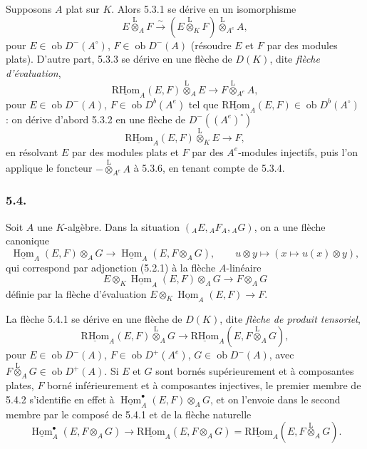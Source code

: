 \documentclass[11pt]{article}
\DeclareMathOperator{\Hom}{Hom}
\newcommand{\R}{\mathrm{R}}\newcommand{\RHomCore}{\mathrm{RHom}}
\newcommand{\ob}{\operatorname{ob}}
\providecommand{\RHom}{\RHomCore}
\providecommand{\uRHom}{\underline{\RHom}}
\providecommand{\uHom}{\underline{\Hom}}
\providecommand{\lten}{\overset{\mathrm L}{\otimes}}
\providecommand{\RHom}{\RHomCore}
\providecommand{\Hom}{\operatorname{Hom}}
\providecommand{\ob}{\operatorname{ob}}
\providecommand{\lten}{\overset{\mathrm L}{\otimes}}
\providecommand{\RHom}{\R\mathcal{H}om}
\providecommand{\lten}{\overset{\mathrm L}{\otimes}}
\providecommand{\R}{\mathrm R}
\providecommand{\lten}{\overset{\mathrm L}{\otimes}}
\providecommand{\lten}{\overset{\mathrm L}{\otimes}}
\providecommand{\lten}{\overset{\mathrm L}{\otimes}}
\providecommand{\RHom}{\RHomCore}
\providecommand{\Hom}{\operatorname{Hom}}
\providecommand{\lten}{\overset{\mathrm L}{\otimes}}
\begin{document}
Supposons $A$ plat sur $K$. Alors 5.3.1 se dérive en un isomorphisme
\begin{equation}\tag{5.3.4}
E\lten_AF\xrightarrow{\sim}(E\lten_KF)\lten_{A^e}A,
\end{equation}
pour $E\in\ob D^-(A^\circ)$, $F\in\ob D^-(A)$ (résoudre $E$ et $F$ par des modules plats). D'autre part, 5.3.3 se dérive en une flèche de $D(K)$, dite \emph{flèche d'évaluation},
\begin{equation}\tag{5.3.5}
\uRHom_A(E,F)\lten_AE\longrightarrow F\lten_{A^e}A,
\end{equation}
pour $E\in\ob D^-(A)$, $F\in\ob D^b(A^e)$ tel que $\uRHom_A(E,F)\in\ob D^b(A^\circ)$ : on dérive d'abord 5.3.2 en une flèche de $D^-((A^e)^\circ)$
\begin{equation}\tag{5.3.6}
\uRHom_A(E,F)\lten_KE\longrightarrow F,
\end{equation}
en résolvant $E$ par des modules plats et $F$ par des $A^e$-modules injectifs, puis l'on applique le foncteur $-\lten_{A^e}A$ à 5.3.6, en tenant compte de 5.3.4.

\subsubsection*{5.4.}

Soit $A$ une $K$-algèbre. Dans la situation $({}_AE,{}_AF_A,{}_AG)$, on a une flèche canonique
\begin{equation}\tag{5.4.1}
\uHom_A(E,F)\otimes_AG\longrightarrow\uHom_A(E,F\otimes_AG),
\qquad u\otimes y\longmapsto(x\longmapsto u(x)\otimes y),
\end{equation}
qui correspond par adjonction (5.2.1) à la flèche $A$-linéaire
\[
E\otimes_K\uHom_A(E,F)\otimes_AG\longrightarrow F\otimes_AG
\]
définie par la flèche d'évaluation $E\otimes_K\uHom_A(E,F)\to F$.

La flèche 5.4.1 se dérive en une flèche de $D(K)$, dite \emph{flèche de produit tensoriel},
\begin{equation}\tag{5.4.2}
\uRHom_A(E,F)\lten_AG\longrightarrow\uRHom_A(E,F\lten_AG),
\end{equation}
pour $E\in\ob D^-(A)$, $F\in\ob D^+(A^e)$, $G\in\ob D^-(A)$, avec $F\lten_AG\in\ob D^+(A)$. Si $E$ et $G$ sont bornés supérieurement et à composantes plates, $F$ borné inférieurement et à composantes injectives, le premier membre de 5.4.2 s'identifie en effet à $\uHom_A^\bullet(E,F)\otimes_AG$, et on l'envoie dans le second membre par le composé de 5.4.1 et de la flèche naturelle
\[
\uHom_A^\bullet(E,F\otimes_AG)\longrightarrow \uRHom_A(E,F\otimes_AG)=\uRHom_A(E,F\lten_AG).
\]
\end{document}
